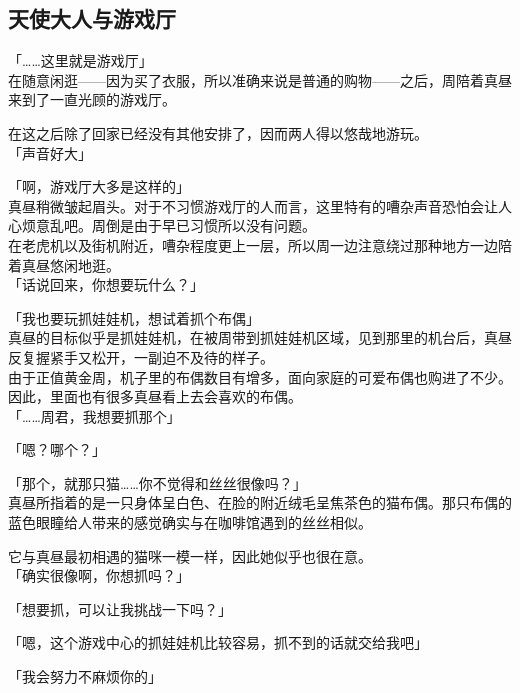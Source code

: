 \subsection{天使大人与游戏厅}

「……这里就是游戏厅」\\

在随意闲逛——因为买了衣服，所以准确来说是普通的购物——之后，周陪着真昼来到了一直光顾的游戏厅。

在这之后除了回家已经没有其他安排了，因而两人得以悠哉地游玩。\\

「声音好大」

「啊，游戏厅大多是这样的」\\

真昼稍微皱起眉头。对于不习惯游戏厅的人而言，这里特有的嘈杂声音恐怕会让人心烦意乱吧。周倒是由于早已习惯所以没有问题。\\

在老虎机以及街机附近，嘈杂程度更上一层，所以周一边注意绕过那种地方一边陪着真昼悠闲地逛。\\

「话说回来，你想要玩什么？」

「我也要玩抓娃娃机，想试着抓个布偶」\\

真昼的目标似乎是抓娃娃机，在被周带到抓娃娃机区域，见到那里的机台后，真昼反复握紧手又松开，一副迫不及待的样子。\\

由于正值黄金周，机子里的布偶数目有增多，面向家庭的可爱布偶也购进了不少。因此，里面也有很多真昼看上去会喜欢的布偶。\\

「……周君，我想要抓那个」

「嗯？哪个？」

「那个，就那只猫……你不觉得和丝丝很像吗？」\\

真昼所指着的是一只身体呈白色、在脸的附近绒毛呈焦茶色的猫布偶。那只布偶的蓝色眼瞳给人带来的感觉确实与在咖啡馆遇到的丝丝相似。

它与真昼最初相遇的猫咪一模一样，因此她似乎也很在意。\\

「确实很像啊，你想抓吗？」

「想要抓，可以让我挑战一下吗？」

「嗯，这个游戏中心的抓娃娃机比较容易，抓不到的话就交给我吧」

「我会努力不麻烦你的」\\

